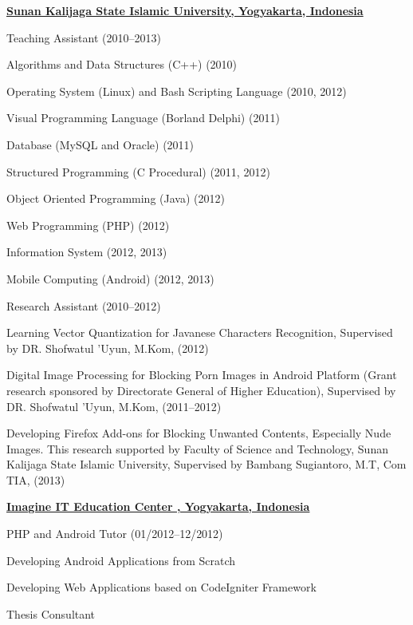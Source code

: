 \documentclass[10pt]{article}
\begin{document}
\vspace{.1in}
\href{http://uin-suka.ac.id/}{\textbf{Sunan Kalijaga State Islamic University, Yogyakarta, Indonesia}}
\begin{outerlist}
	\item[] Teaching Assistant \hfill(2010--2013)
		\begin{innerlist}
		\item Algorithms and Data Structures (C++) \hfill(2010) 
		\item Operating System (Linux) and Bash Scripting Language \hfill(2010, 2012) 
		\item Visual Programming Language (Borland Delphi) \hfill(2011) 
		\item Database (MySQL and Oracle) \hfill(2011) 
		\item Structured Programming (C Procedural) \hfill(2011, 2012) 
		\item Object Oriented Programming (Java) \hfill(2012) 
		\item Web Programming (PHP) \hfill(2012) 
		\item Information System \hfill(2012, 2013) 
		\item Mobile Computing (Android) \hfill(2012, 2013) 
		\end{innerlist}
		
	\item[] Research Assistant \hfill(2010--2012)
		\begin{innerlist}
			\item Learning Vector Quantization for Javanese Characters Recognition, Supervised by DR. Shofwatul 'Uyun, M.Kom, \hfill(2012)
			\item Digital Image Processing for Blocking Porn Images in Android Platform (Grant research sponsored by Directorate General of Higher Education), Supervised by DR. Shofwatul 'Uyun, M.Kom, \hfill(2011--2012) 
			\item Developing Firefox Add-ons for Blocking Unwanted Contents, Especially Nude Images. This research supported by Faculty of Science and Technology, Sunan Kalijaga State Islamic University, Supervised by Bambang Sugiantoro, M.T, Com TIA, \hfill(2013)
			
		\end{innerlist}
\end{outerlist}


\vspace{.1in}

\href{}{\textbf{Imagine IT Education Center , Yogyakarta, Indonesia}}
\begin{outerlist}
	\item[] PHP and Android Tutor \hfill(01/2012--12/2012)
		\begin{innerlist}
		\item Developing Android Applications from Scratch
		\item Developing Web Applications based on CodeIgniter Framework
		\item Thesis Consultant
		
		\end{innerlist}
\end{outerlist}
\end{document}
